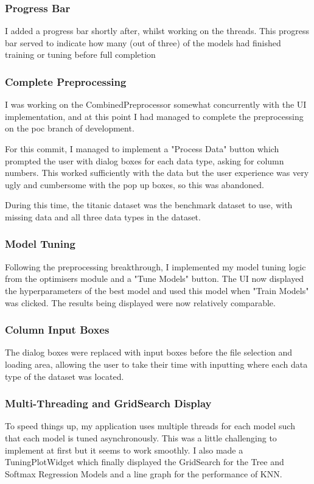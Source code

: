 \documentclass[letterpaper,10pt]{article}
\begin{document}
\subsubsection{Progress Bar}
I added a progress bar shortly after, whilst working on the threads. This progress bar served to indicate how many (out of three) of the models had finished training or tuning before full completion

\subsubsection{Complete Preprocessing}
I was working on the CombinedPreprocessor somewhat concurrently with the UI implementation, and at this point I had managed to complete the preprocessing on the poc branch of development. \par
For this commit, I managed to implement a "Process Data" button which prompted the user with dialog boxes for each data type, asking for column numbers. This worked sufficiently with the data but the user experience was very ugly and cumbersome with the pop up boxes, so this was abandoned. \par
During this time, the titanic dataset was the benchmark dataset to use, with missing data and all three data types in the dataset. \par

\subsubsection{Model Tuning}
Following the preprocessing breakthrough, I implemented my model tuning logic from the optimisers module and a "Tune Models" button. The UI now displayed the hyperparameters of the best model and used this model when "Train Models" was clicked. The results being displayed were now relatively comparable. 

\subsubsection{Column Input Boxes}
The dialog boxes were replaced with input boxes before the file selection and loading area, allowing the user to take their time with inputting where each data type of the dataset was located. 

\subsubsection{Multi-Threading and GridSearch Display}
To speed things up, my application uses multiple threads for each model such that each model is tuned asynchronously. This was a little challenging to implement at first but it seems to work smoothly. I also made a TuningPlotWidget which finally displayed the GridSearch for the Tree and Softmax Regression Models and a line graph for the performance of KNN. 
\end{document}
